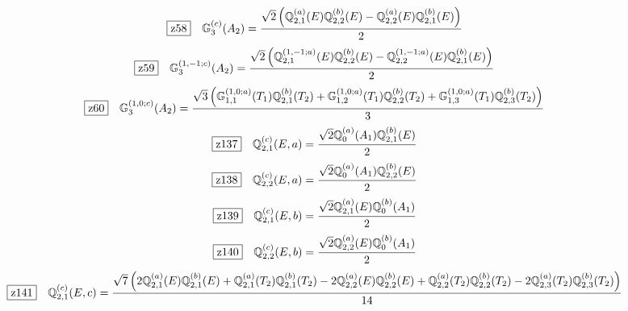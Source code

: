 \documentclass[fleqn,10pt,landscape]{jsarticle}
\begin{document}
\begin{dmath*}
\hspace*{3mm}\fbox{z58}\quad \mathbb{G}_{3}^{(c)}(A_{2})=\frac{\sqrt{2} \left(\mathbb{Q}_{2,1}^{(a)}(E) \mathbb{Q}_{2,2}^{(b)}(E) - \mathbb{Q}_{2,2}^{(a)}(E) \mathbb{Q}_{2,1}^{(b)}(E)\right)}{2}
\end{dmath*}
\begin{dmath*}
\hspace*{3mm}\fbox{z59}\quad \mathbb{G}_{3}^{(1,-1;c)}(A_{2})=\frac{\sqrt{2} \left(\mathbb{Q}_{2,1}^{(1,-1;a)}(E) \mathbb{Q}_{2,2}^{(b)}(E) - \mathbb{Q}_{2,2}^{(1,-1;a)}(E) \mathbb{Q}_{2,1}^{(b)}(E)\right)}{2}
\end{dmath*}
\begin{dmath*}
\hspace*{3mm}\fbox{z60}\quad \mathbb{G}_{3}^{(1,0;c)}(A_{2})=\frac{\sqrt{3} \left(\mathbb{G}_{1,1}^{(1,0;a)}(T_{1}) \mathbb{Q}_{2,1}^{(b)}(T_{2}) + \mathbb{G}_{1,2}^{(1,0;a)}(T_{1}) \mathbb{Q}_{2,2}^{(b)}(T_{2}) + \mathbb{G}_{1,3}^{(1,0;a)}(T_{1}) \mathbb{Q}_{2,3}^{(b)}(T_{2})\right)}{3}
\end{dmath*}
\begin{dmath*}
\hspace*{3mm}\fbox{z137}\quad \mathbb{Q}_{2,1}^{(c)}(E,a)=\frac{\sqrt{2} \mathbb{Q}_{0}^{(a)}(A_{1}) \mathbb{Q}_{2,1}^{(b)}(E)}{2}
\end{dmath*}
\begin{dmath*}
\hspace*{3mm}\fbox{z138}\quad \mathbb{Q}_{2,2}^{(c)}(E,a)=\frac{\sqrt{2} \mathbb{Q}_{0}^{(a)}(A_{1}) \mathbb{Q}_{2,2}^{(b)}(E)}{2}
\end{dmath*}
\begin{dmath*}
\hspace*{3mm}\fbox{z139}\quad \mathbb{Q}_{2,1}^{(c)}(E,b)=\frac{\sqrt{2} \mathbb{Q}_{2,1}^{(a)}(E) \mathbb{Q}_{0}^{(b)}(A_{1})}{2}
\end{dmath*}
\begin{dmath*}
\hspace*{3mm}\fbox{z140}\quad \mathbb{Q}_{2,2}^{(c)}(E,b)=\frac{\sqrt{2} \mathbb{Q}_{2,2}^{(a)}(E) \mathbb{Q}_{0}^{(b)}(A_{1})}{2}
\end{dmath*}
\begin{dmath*}
\hspace*{3mm}\fbox{z141}\quad \mathbb{Q}_{2,1}^{(c)}(E,c)=\frac{\sqrt{7} \left(2 \mathbb{Q}_{2,1}^{(a)}(E) \mathbb{Q}_{2,1}^{(b)}(E) + \mathbb{Q}_{2,1}^{(a)}(T_{2}) \mathbb{Q}_{2,1}^{(b)}(T_{2}) - 2 \mathbb{Q}_{2,2}^{(a)}(E) \mathbb{Q}_{2,2}^{(b)}(E) + \mathbb{Q}_{2,2}^{(a)}(T_{2}) \mathbb{Q}_{2,2}^{(b)}(T_{2}) - 2 \mathbb{Q}_{2,3}^{(a)}(T_{2}) \mathbb{Q}_{2,3}^{(b)}(T_{2})\right)}{14}
\end{dmath*}
\end{document}
